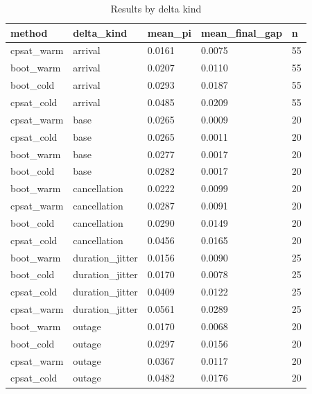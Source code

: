 \begin{table}[t]
\centering
\begin{tabular}{lllll}
\toprule
method & delta\_kind & mean\_pi & mean\_final\_gap & n \\
\midrule
cpsat\_warm & arrival & 0.0161 & 0.0075 & 55 \\
boot\_warm & arrival & 0.0207 & 0.0110 & 55 \\
boot\_cold & arrival & 0.0293 & 0.0187 & 55 \\
cpsat\_cold & arrival & 0.0485 & 0.0209 & 55 \\
cpsat\_warm & base & 0.0265 & 0.0009 & 20 \\
cpsat\_cold & base & 0.0265 & 0.0011 & 20 \\
boot\_warm & base & 0.0277 & 0.0017 & 20 \\
boot\_cold & base & 0.0282 & 0.0017 & 20 \\
boot\_warm & cancellation & 0.0222 & 0.0099 & 20 \\
cpsat\_warm & cancellation & 0.0287 & 0.0091 & 20 \\
boot\_cold & cancellation & 0.0290 & 0.0149 & 20 \\
cpsat\_cold & cancellation & 0.0456 & 0.0165 & 20 \\
boot\_warm & duration\_jitter & 0.0156 & 0.0090 & 25 \\
boot\_cold & duration\_jitter & 0.0170 & 0.0078 & 25 \\
cpsat\_cold & duration\_jitter & 0.0409 & 0.0122 & 25 \\
cpsat\_warm & duration\_jitter & 0.0561 & 0.0289 & 25 \\
boot\_warm & outage & 0.0170 & 0.0068 & 20 \\
boot\_cold & outage & 0.0297 & 0.0156 & 20 \\
cpsat\_warm & outage & 0.0367 & 0.0117 & 20 \\
cpsat\_cold & outage & 0.0482 & 0.0176 & 20 \\
\bottomrule
\end{tabular}
\caption{Results by delta kind}
\label{tab:by-delta}
\end{table}
